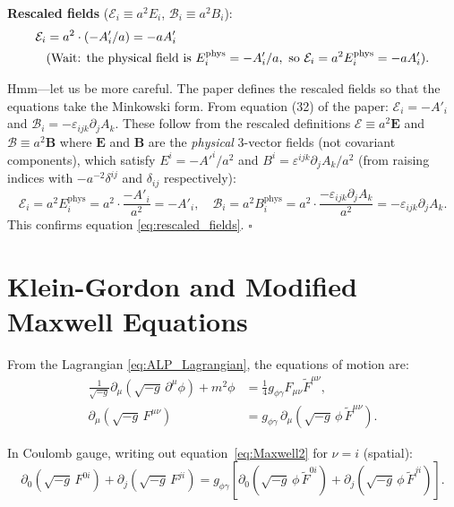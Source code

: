 \documentclass[12pt,a4paper]{report}
\newcommand{\gag}{g_{\phi\gamma}}
\renewcommand{\vec}[1]{\boldsymbol{#1}}
\theoremstyle{definition}
\begin{document}
\textbf{Rescaled fields} ($\mathcal{E}_i\equiv a^2 E_i$, $\mathcal{B}_i\equiv a^2 B_i$):
\begin{align}
  \mathcal{E}_i &= a^2\cdot(-A'_i/a) = -a A'_i \notag\\
  &\text{(Wait: the physical field is }E_i^{\mathrm{phys}}=-A'_i/a,\text{ so }
   \mathcal{E}_i=a^2 E_i^{\mathrm{phys}}=-aA'_i). \notag
\end{align}

Hmm---let us be more careful. The paper defines the rescaled fields so that the
equations take the Minkowski form. From equation (32) of the paper:
$\mathcal{E}_i = -A'_i$ and $\mathcal{B}_i = -\varepsilon_{ijk}\partial_j A_k$.
These follow from the rescaled definitions $\mathcal{E}\equiv a^2\vec{E}$ and
$\mathcal{B}\equiv a^2\vec{B}$ where $\vec{E}$ and $\vec{B}$ are the \emph{physical}
3-vector fields (not covariant components), which satisfy
$E^i = -A'^i/a^2$ and $B^i = \varepsilon^{ijk}\partial_j A_k/a^2$
(from raising indices with $-a^{-2}\delta^{ij}$ and $\delta_{ij}$ respectively):
\begin{equation}
  \mathcal{E}_i = a^2 E_i^{\mathrm{phys}} = a^2\cdot\frac{-A'_i}{a^2} = -A'_i, \quad
  \mathcal{B}_i = a^2 B_i^{\mathrm{phys}} = a^2\cdot\frac{-\varepsilon_{ijk}\partial_j A_k}{a^2}
    = -\varepsilon_{ijk}\partial_j A_k.
  \label{eq:rescaled_derive}
\end{equation}
This confirms equation \eqref{eq:rescaled_fields}. $\square$

\section{Klein-Gordon and Modified Maxwell Equations}

From the Lagrangian \eqref{eq:ALP_Lagrangian}, the equations of motion are:
\begin{align}
  \frac{1}{\sqrt{-g}}\partial_\mu(\sqrt{-g}\,\partial^\mu\phi)+m^2\phi
  &= \frac{1}{4}\gag F_{\mu\nu}\tilde F^{\mu\nu},
  \label{eq:KG2}\\[4pt]
  \partial_\mu(\sqrt{-g}\,F^{\mu\nu})
  &= \gag\,\partial_\mu(\sqrt{-g}\,\phi\,\tilde F^{\mu\nu}).
  \label{eq:Maxwell2}
\end{align}

In Coulomb gauge, writing out equation~\eqref{eq:Maxwell2} for $\nu=i$ (spatial):
\begin{equation}
  \partial_0(\sqrt{-g}\,F^{0i})+\partial_j(\sqrt{-g}\,F^{ji})
  = \gag\left[\partial_0(\sqrt{-g}\,\phi\,\tilde F^{0i})
              +\partial_j(\sqrt{-g}\,\phi\,\tilde F^{ji})\right].
  \label{eq:Maxwell_spatial}
\end{equation}
\end{document}
